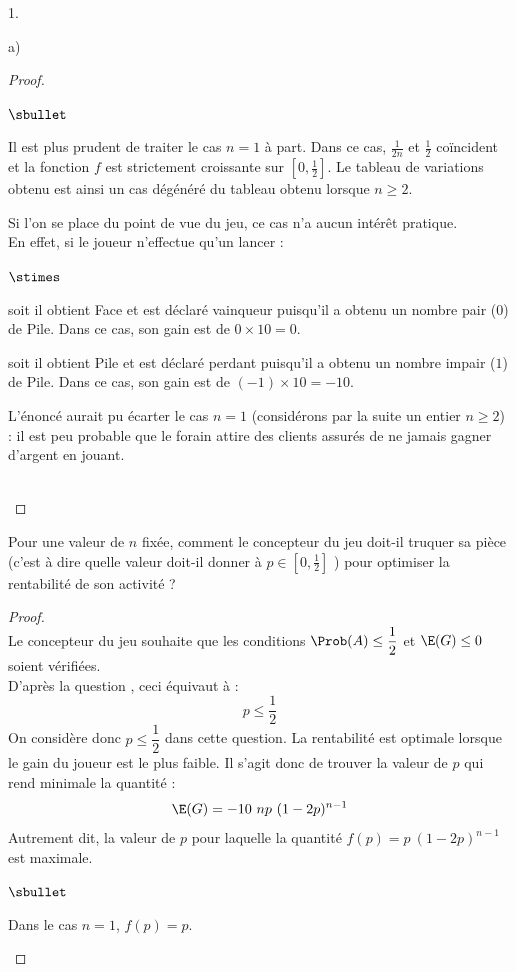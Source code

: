 \begin{noliste}{1.}
\begin{noliste}{a)}
\begin{proof}
    \newpage


    \begin{remarkL}{.92}%
      \begin{noliste}{$\sbullet$}
      \item Il est plus prudent de traiter le cas $n = 1$ à part. Dans
        ce cas, $\frac{1}{2n}$ et $\frac{1}{2}$ coïncident et la
        fonction $f$ est strictement croissante sur $[0,
        \frac{1}{2}]$. Le tableau de variations obtenu est ainsi un
        cas dégénéré du tableau obtenu lorsque $n \geq 2$.
      \item Si l'on se place du point de vue du jeu, ce cas n'a aucun
        intérêt pratique. \\
        En effet, si le joueur n'effectue qu'un lancer :
        \begin{noliste}{$\stimes$}
        \item soit il obtient Face et est déclaré vainqueur puisqu'il
          a obtenu un nombre pair ($0$) de Pile. Dans ce cas, son gain
          est de $0 \times 10 = 0$.
        \item soit il obtient Pile et est déclaré perdant puisqu'il a
          obtenu un nombre impair ($1$) de Pile. Dans ce cas, son gain
          est de $(-1) \times 10 = -10$.
        \end{noliste}
        L'énoncé aurait pu écarter le cas $n = 1$ (\og considérons par
        la suite un entier $n \geq 2$\fg{}) : il est peu probable que
        le forain attire des clients assurés de ne jamais gagner
        d'argent en jouant.
      \end{noliste}
    \end{remarkL}~\\[-1.4cm]
  \end{proof}

  \item Pour une valeur de $n$ fixée, comment le concepteur du jeu
    doit-il truquer sa pièce (c'est à dire quelle valeur doit-il
    donner à $p \in \left[0, \frac{1}{2} \right]$ ) pour optimiser la
    rentabilité de son activité ?

    \begin{proof}~\\%
      Le concepteur du jeu souhaite que les conditions $\Prob(A) \leq
      \dfrac{1}{2}$ et $\E(G) \leq 0$ soient vérifiées.\\
      D'après la question , ceci équivaut à :
      \[
      p \leq \dfrac{1}{2}
      \]
      On considère donc $p \leq \dfrac{1}{2}$ dans cette question. La
      rentabilité est optimale lorsque le gain du joueur est le plus
      faible. Il s'agit donc de trouver la valeur de $p$ qui rend
      minimale la quantité : 
      \[
      \E(G) = -10 \ np \ (1-2p)^{n-1}
      \]
      Autrement dit, la valeur de $p$ pour laquelle la quantité $f(p)
      = p \ (1-2p)^{n-1}$ est maximale.
      \begin{noliste}{$\sbullet$}
      \item Dans le cas $n = 1$, $f(p) = p$. %
        

\end{noliste}
\end{proof}
\end{noliste}
\end{noliste}
